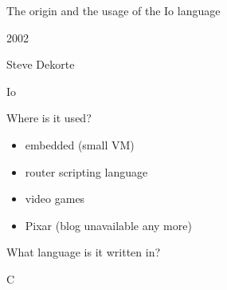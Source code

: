 \begin{frame}
  \begin{center}
    The origin and the usage of the Io language
  \end{center}
\end{frame}

\begin{frame}
  \begin{center}
    2002
  \end{center}
\end{frame}

\begin{frame}
  \begin{center}
    Steve Dekorte
  \end{center}
\end{frame}

\begin{frame}
  \begin{center}
    Io
  \end{center}
\end{frame}

\begin{frame}
  \begin{center}
    Where is it used?
    \vskip15pt
    \begin{itemize}
      \item<2-> embedded (small VM)
      \item<3-> router scripting language
      \item<4-> video games
      \item<5-> Pixar (blog unavailable any more)
    \end{itemize}
  \end{center}
\end{frame}

\begin{frame}
  \begin{center}
    What language is it written in?
    \vskip15pt
    
    C
  \end{center}
\end{frame}